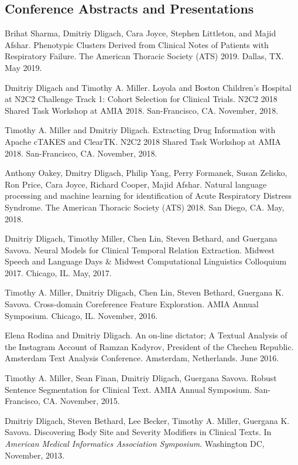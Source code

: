 \documentclass[letterpaper]{article}
\renewenvironment{itemize}{
  \begin{list}{}{
    \setlength{\leftmargin}{1.5em}
  }
}{
  \end{list}
}
\begin{document}
\subsection*{Conference Abstracts and Presentations}
\begin{itemize}
\item Brihat Sharma, Dmitriy Dligach, Cara Joyce, Stephen Littleton, and Majid Afshar. Phenotypic Clusters Derived from Clinical Notes of Patients with Respiratory Failure. The American Thoracic Society (ATS) 2019. Dallas, TX. May 2019.
\item Dmitriy Dligach and Timothy A. Miller. Loyola and Boston Children's Hospital at N2C2 Challenge Track 1: Cohort Selection for Clinical Trials. N2C2 2018 Shared Task Workshop at AMIA 2018. San-Francisco, CA. November, 2018.
\item Timothy A. Miller and Dmitriy Dligach. Extracting Drug Information with Apache cTAKES and ClearTK. N2C2 2018 Shared Task Workshop at AMIA 2018. San-Francisco, CA. November, 2018.
\item Anthony Oakey, Dmitry Dligach, Philip Yang, Perry Formanek, Susan Zelisko, Ron Price, Cara Joyce, Richard Cooper, Majid Afshar. Natural language processing and machine learning for identification of Acute Respiratory Distress Syndrome. The American Thoracic Society (ATS) 2018. San Diego, CA. May, 2018.
\item Dmitriy Dligach, Timothy Miller, Chen Lin, Steven Bethard, and Guergana Savova. Neural Models for Clinical Temporal Relation Extraction. Midwest Speech and Language Days \& Midwest Computational Linguistics Colloquium 2017. Chicago, IL. May, 2017.
\item Timothy A. Miller, Dmitriy Dligach, Chen Lin, Steven Bethard, Guergana K. Savova. Cross-domain Coreference Feature Exploration. AMIA Annual Symposium. Chicago, IL. November, 2016.
\item Elena Rodina and Dmitriy Dligach. An on-line dictator; A Textual Analysis of the Instagram Account of Ramzan Kadyrov, President of the Chechen Republic. Amsterdam Text Analysis Conference. Amsterdam, Netherlands. June 2016.
\item Timothy A. Miller, Sean Finan, Dmitriy Dligach, Guergana Savova. Robust Sentence Segmentation for Clinical Text. AMIA Annual Symposium. San-Francisco, CA. November, 2015.
\item Dmitriy Dligach, Steven Bethard, Lee Becker, Timothy A. Miller, Guergana K. Savova. Discovering Body Site and Severity Modifiers in Clinical Texts. In \emph{American Medical Informatics Association Symposium}. Washington DC, November, 2013.

\end{itemize}
\end{document}
